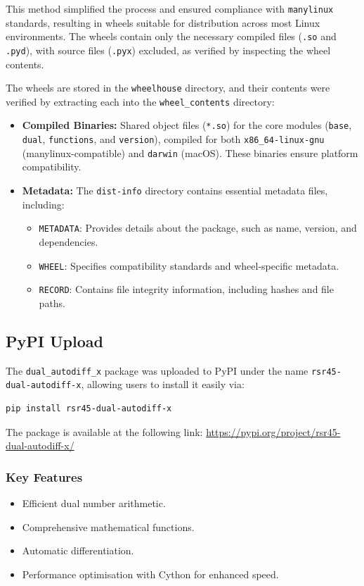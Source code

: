 \documentclass[a4paper,12pt]{article}
\begin{document}
This method simplified the process and ensured compliance with \texttt{manylinux} standards, resulting in wheels suitable for distribution across most Linux environments. The wheels contain only the necessary compiled files (\texttt{.so} and \texttt{.pyd}), with source files (\texttt{.pyx}) excluded, as verified by inspecting the wheel contents.

The wheels are stored in the \texttt{wheelhouse} directory, and their contents were verified by extracting each into the \texttt{wheel\_contents} directory:
\begin{itemize}
    \item \textbf{Compiled Binaries:} Shared object files (\texttt{*.so}) for the core modules (\texttt{base}, \texttt{dual}, \texttt{functions}, and \texttt{version}), compiled for both \texttt{x86\_64-linux-gnu} (manylinux-compatible) and \texttt{darwin} (macOS). These binaries ensure platform compatibility.
    \item \textbf{Metadata:} The \texttt{dist-info} directory contains essential metadata files, including:
    \begin{itemize}
        \item \texttt{METADATA}: Provides details about the package, such as name, version, and dependencies.
        \item \texttt{WHEEL}: Specifies compatibility standards and wheel-specific metadata.
        \item \texttt{RECORD}: Contains file integrity information, including hashes and file paths.
    \end{itemize}
\end{itemize}


\subsection{PyPI Upload}

The \texttt{dual\_autodiff\_x} package was uploaded to PyPI under the name \texttt{rsr45-dual-autodiff-x}, allowing users to install it easily via:
\begin{verbatim}
pip install rsr45-dual-autodiff-x
\end{verbatim}

The package is available at the following link: \href{https://pypi.org/project/rsr45-dual-autodiff-x/}{https://pypi.org/project/rsr45-dual-autodiff-x/}

\subsubsection{Key Features}
\begin{itemize}
    \item Efficient dual number arithmetic.
    \item Comprehensive mathematical functions.
    \item Automatic differentiation.
    \item Performance optimisation with Cython for enhanced speed.
\end{itemize}
\end{document}
